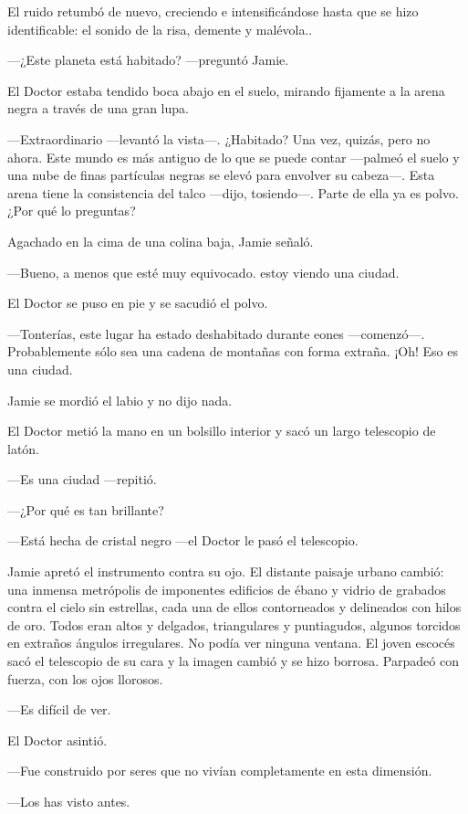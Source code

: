 El ruido retumbó de nuevo, creciendo e intensificándose hasta que se
hizo identificable: el sonido de la risa, demente y malévola..

---¿Este planeta está habitado? ---preguntó Jamie.

El Doctor estaba tendido boca abajo en el suelo, mirando fijamente a la
arena negra a través de una gran lupa.~

---Extraordinario ---levantó la vista---. ¿Habitado? Una vez, quizás,
pero no ahora. Este mundo es más antiguo de lo que se puede
contar ---palmeó el suelo y una nube de finas partículas negras se elevó
para envolver su cabeza---. Esta arena tiene la consistencia del
talco ---dijo, tosiendo---. Parte de ella ya es polvo. ¿Por qué lo
preguntas?

Agachado en la cima de una colina baja, Jamie señaló.~

---Bueno, a menos que esté muy equivocado. estoy viendo una ciudad.

El Doctor se puso en pie y se sacudió el polvo.~

---Tonterías, este lugar ha estado deshabitado durante
eones ---comenzó---. Probablemente sólo sea  una cadena de montañas con
forma extraña. ¡Oh! Eso es una ciudad.

Jamie se mordió el labio y no dijo nada.

El Doctor metió la mano en un bolsillo interior y sacó un largo
telescopio de latón.~

---Es una ciudad ---repitió.

---¿Por qué es tan brillante?

---Está hecha de cristal negro ---el Doctor le pasó el telescopio.

Jamie apretó el instrumento contra su ojo. El distante paisaje urbano
cambió: una inmensa metrópolis de imponentes edificios de ébano y vidrio
de grabados contra el cielo sin estrellas, cada una de ellos
contorneados y delineados con hilos de oro. Todos eran altos y delgados,
triangulares y puntiagudos, algunos torcidos en extraños ángulos
irregulares. No podía ver ninguna ventana. El joven escocés sacó el
telescopio de su cara y la imagen cambió y se hizo borrosa. Parpadeó con
fuerza, con los ojos llorosos.~

---Es difícil de ver.

El Doctor asintió.~

---Fue construido por seres que no vivían completamente en esta
dimensión.

---Los has visto antes.

